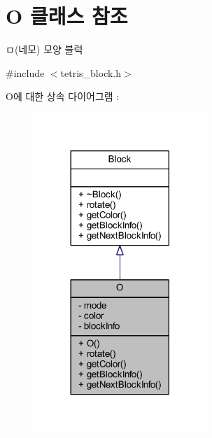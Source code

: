 \hypertarget{class_o}{}\section{O 클래스 참조}
\label{class_o}


ㅁ(네모) 모양 블럭  




{\ttfamily \#include $<$tetris\+\_\+block.\+h$>$}



O에 대한 상속 다이어그램 \+: 
\nopagebreak
\begin{figure}[H]
\begin{center}
\leavevmode
\includegraphics[width=185pt]{class_o__inherit__graph}
\end{center}
\end{figure}


